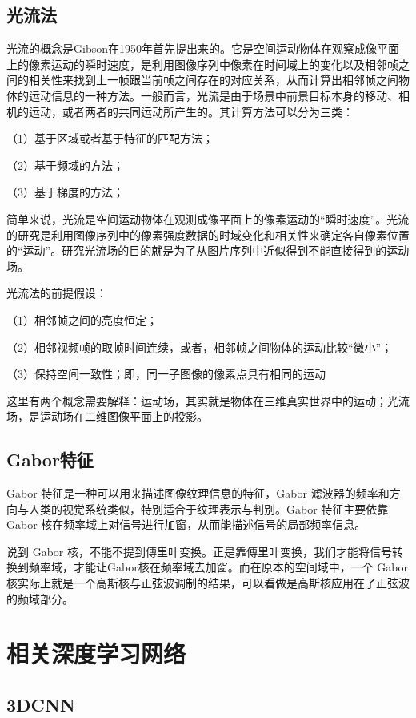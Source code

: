 \subsection{光流法}

光流的概念是Gibson在1950年首先提出来的。它是空间运动物体在观察成像平面上的像素运动的瞬时速度，是利用图像序列中像素在时间域上的变化以及相邻帧之间的相关性来找到上一帧跟当前帧之间存在的对应关系，从而计算出相邻帧之间物体的运动信息的一种方法。一般而言，光流是由于场景中前景目标本身的移动、相机的运动，或者两者的共同运动所产生的。其计算方法可以分为三类：

（1）基于区域或者基于特征的匹配方法；

（2）基于频域的方法；

（3）基于梯度的方法；

简单来说，光流是空间运动物体在观测成像平面上的像素运动的“瞬时速度”。光流的研究是利用图像序列中的像素强度数据的时域变化和相关性来确定各自像素位置的“运动”。研究光流场的目的就是为了从图片序列中近似得到不能直接得到的运动场。

光流法的前提假设：

（1）相邻帧之间的亮度恒定；

（2）相邻视频帧的取帧时间连续，或者，相邻帧之间物体的运动比较“微小”；

（3）保持空间一致性；即，同一子图像的像素点具有相同的运动

这里有两个概念需要解释：运动场，其实就是物体在三维真实世界中的运动；光流场，是运动场在二维图像平面上的投影。

\subsection{Gabor特征}

Gabor 特征是一种可以用来描述图像纹理信息的特征，Gabor 滤波器的频率和方向与人类的视觉系统类似，特别适合于纹理表示与判别。Gabor 特征主要依靠 Gabor 核在频率域上对信号进行加窗，从而能描述信号的局部频率信息。

说到 Gabor 核，不能不提到傅里叶变换。正是靠傅里叶变换，我们才能将信号转换到频率域，才能让Gabor核在频率域去加窗。而在原本的空间域中，一个 Gabor 核实际上就是一个高斯核与正弦波调制的结果，可以看做是高斯核应用在了正弦波的频域部分。

\section{相关深度学习网络}

\subsection{3DCNN}

